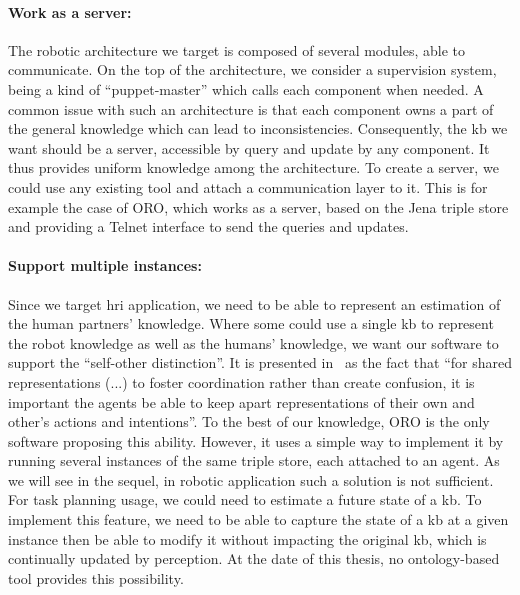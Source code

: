 \paragraph{Work as a server:} The robotic architecture we target is composed of several modules, able to communicate. On the top of the architecture, we consider a supervision system, being a kind of ``puppet-master'' which calls each component when needed. A common issue with such an architecture is that each component owns a part of the general knowledge which can lead to inconsistencies. Consequently, the \acrlong{kb} we want should be a server, accessible by query and update by any component. It thus provides uniform knowledge among the architecture. To create a server, we could use any existing tool and attach a communication layer to it. This is for example the case of ORO, which works as a server, based on the Jena triple store and providing a Telnet interface to send the queries and updates.

\paragraph{Support multiple instances:} Since we target \acrshort{hri} application, we need to be able to represent an estimation of the human partners' knowledge. Where some could use a single \acrlong{kb} to represent the robot knowledge as well as the humans' knowledge, we want our software to support the ``self-other distinction''. It is presented in~\cite{pacherie_2012_phenomenology} as the fact that ``for shared representations (...) to foster coordination rather than create confusion, it is important the agents be able to keep apart representations of their own and other's actions and intentions''. To the best of our knowledge, ORO is the only software proposing this ability. However, it uses a simple way to implement it by running several instances of the same triple store, each attached to an agent. As we will see in the sequel, in robotic application such a solution is not sufficient. For task planning usage, we could need to estimate a future state of a \acrshort{kb}. To implement this feature, we need to be able to capture the state of a \acrshort{kb} at a given instance then be able to modify it without impacting the original \acrshort{kb}, which is continually updated by perception. At the date of this thesis, no ontology-based tool provides this possibility.

